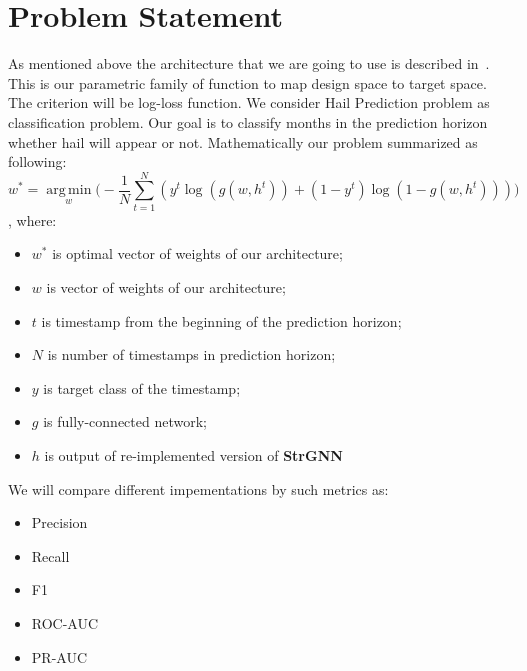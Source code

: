 \documentclass{article}
\DeclareMathOperator*{\argmin}{arg\,min}
\begin{document}
\section{Problem Statement}
As mentioned above the architecture that we are going to use is described in~\cite{DBLP:journals/corr/abs-2005-07427}. This is our parametric family of function to map design space to target space. The criterion will be log-loss function. We consider Hail Prediction problem as classification problem. Our goal is to classify months in the prediction horizon whether hail will appear or not.
Mathematically our problem summarized as following:
\begin{equation}
    w^* = \argmin\limits_w \Big ( - \frac{1}{N}\sum\limits_{t = 1 }^{N}(y ^ t \log(g(w, h^t)) + (1 - y ^ t)\log(1 - g(w, h^t)))\Big )
\end{equation}
, where: \\
\begin{itemize}
    \item $w^*$ is optimal vector of weights of our architecture;
    \item $w$ is vector of weights of our architecture;
    \item $t$ is timestamp from the beginning of the prediction horizon;
    \item $N$ is number of timestamps in prediction horizon;
    \item $y$ is target class of the timestamp;
    \item $g$ is fully-connected network;
    \item $h$ is output of re-implemented version of \textbf{StrGNN}~\cite{DBLP:journals/corr/abs-2005-07427}
\end{itemize}
We will compare different impementations by such metrics as: 
\begin{itemize}
    \item Precision
    \item Recall
    \item F1
    \item ROC-AUC
    \item PR-AUC
\end{itemize}



\end{document}
